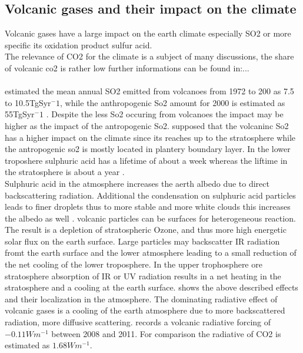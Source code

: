 \documentclass  [
  paper    = a4,
  BCOR     = 10mm,
  twoside,
  fontsize = 12pt,
  fleqn,
  toc      = bibnumbered,
  toc      = listofnumbered,
  numbers  = noendperiod,
  headings = normal,
  listof   = leveldown,
  version  = 3.03
]                                       {scrreprt}
\begin{document}
\subsection{Volcanic gases and their impact on the climate}
Volcanic gases have a large impact on the earth climate especially SO2 or more specific its oxidation product sulfur acid.\\ 
The relevance of CO2 for the climate is a subject of many discussions, the share of volcanic co2 is rather low further informations can be found in:...\\\\
\cite{halmer2002annual} estimated the mean annual SO2 emitted from volcanoes from 1972 to 200 as 7.5 to 10.5TgSyr$^-1$, while the anthropogenic So2 amount for 2000 is estimated as 55TgSyr$^-1$ \cite{IPCC}. Despite the less So2 occuring from volcanoes the impact may be higher as the impact of the antropogenic So2. \cite{graf1997volcanic} supposed that the volcaninc So2 has a higher impact on the climate since its reaches up to the stratosphere while the antropogenic so2 is mostly located in plantery boundary layer. In the lower troposhere sulphuric acid has a lifetime of about a week whereas the liftime in the stratosphere is about a year \cite{IPCC}.\\
Sulphuric acid in the atmosphere increases the aerth albedo due to direct backscattering radiation. Additional the condensation on sulphuric acid particles leads to finer droplets thus to more stable and more white clouds this increases the albedo as well \cite{twomey1974pollution}.
volcanic particles can be surfaces for heterogeneous reaction. The result is a depletion of stratospheric Ozone, and thus more high energetic solar flux on the earth surface.
Large particles may backscatter IR radiation fromt the earth surface and the lower atmosphere leading to a small reduction of the net cooling of the lower troposphere.
In the upper trophosphere ore stratosphere absorption of IR or UV radiation results in a net heating in the stratosphere and a cooling at the earth surface.
 shows the above described effects and their localization in the atmosphere.
The dominating radiative effect of volcanic gases is a cooling of the earth atmosphere due to  more backscattered radiation, more diffusive scattering\cite{robock2000volcanic}.
\cite{IPCC} records a volcanic radiative forcing of $-0.11Wm^{-1}$ between 2008 and 2011. For comparison the radiative of CO2 is estimated as  $1.68Wm^{-1}$.
\end{document}
